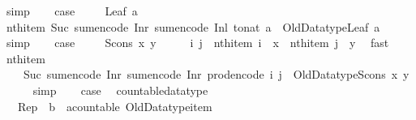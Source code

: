 \begin{isabellebody}
\ simp\isanewline
\ \ \isamarkupfalse%
\ {\isacharquery}case\ \isacommand{{\isachardot}{\isachardot}}\isamarkupfalse%
\isanewline
{}\isamarkupfalse%
\isanewline
\ \ \isamarkupfalse%
\ {\isacharparenleft}Leaf\ a{\isacharparenright}\isanewline
\ \ \isamarkupfalse%
\ {\isachardoublequoteopen}nth{\isacharunderscore}item\ {\isacharparenleft}Suc\ {\isacharparenleft}sum{\isacharunderscore}encode\ {\isacharparenleft}Inr\ {\isacharparenleft}sum{\isacharunderscore}encode\ {\isacharparenleft}Inl\ {\isacharparenleft}to{\isacharunderscore}nat\ a{\isacharparenright}{\isacharparenright}{\isacharparenright}{\isacharparenright}{\isacharparenright}{\isacharparenright}\ {\isacharequal}\ Old{\isacharunderscore}Datatype{\isachardot}Leaf\ a{\isachardoublequoteclose}\isanewline
\ \ \ \ \isamarkupfalse%
\ simp\isanewline
\ \ \isamarkupfalse%
\ {\isacharquery}case\ \isacommand{{\isachardot}{\isachardot}}\isamarkupfalse%
\isanewline
{}\isamarkupfalse%
\isanewline
\ \ \isamarkupfalse%
\ {\isacharparenleft}Scons\ x\ y{\isacharparenright}\isanewline
\ \ \isamarkupfalse%
\ \isamarkupfalse%
\ i\ j\ \ {\isachardoublequoteopen}nth{\isacharunderscore}item\ i\ {\isacharequal}\ x{\isachardoublequoteclose}\ \ {\isachardoublequoteopen}nth{\isacharunderscore}item\ j\ {\isacharequal}\ y{\isachardoublequoteclose}\ \isamarkupfalse%
\ fast\isanewline
\ \ \isamarkupfalse%
\ {\isachardoublequoteopen}nth{\isacharunderscore}item\isanewline
\ \ \ \ {\isacharparenleft}Suc\ {\isacharparenleft}sum{\isacharunderscore}encode\ {\isacharparenleft}Inr\ {\isacharparenleft}sum{\isacharunderscore}encode\ {\isacharparenleft}Inr\ {\isacharparenleft}prod{\isacharunderscore}encode\ {\isacharparenleft}i{\isacharcomma}\ j{\isacharparenright}{\isacharparenright}{\isacharparenright}{\isacharparenright}{\isacharparenright}{\isacharparenright}{\isacharparenright}\ {\isacharequal}\ Old{\isacharunderscore}Datatype{\isachardot}Scons\ x\ y{\isachardoublequoteclose}\isanewline
\ \ \ \ \isamarkupfalse%
\ simp\isanewline
\ \ \isamarkupfalse%
\ {\isacharquery}case\ \isacommand{{\isachardot}{\isachardot}}\isamarkupfalse%
\isanewline
{}\isamarkupfalse%
%
\endisatagproof
{\isafoldproof}%
%
\isadelimproof
\isanewline
%
\endisadelimproof
\isanewline
{}\isamarkupfalse%
\ countable{\isacharunderscore}datatype{\isacharcolon}\isanewline
\ \ \ Rep\ {\isacharcolon}{\isacharcolon}\ {\isachardoublequoteopen}{\isacharprime}b\ {\isasymRightarrow}\ {\isacharparenleft}{\isacharprime}a{\isacharcolon}{\isacharcolon}countable{\isacharparenright}\ Old{\isacharunderscore}Datatype{\isachardot}item{\isachardoublequoteclose}\isanewline

\end{isabellebody}
